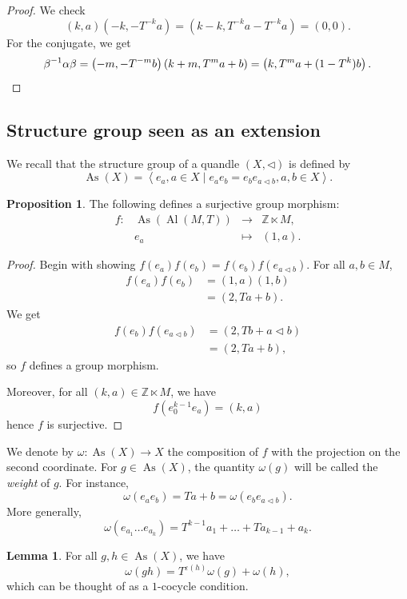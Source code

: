 \documentclass[a4paper,11pt]{amsart}
\theoremstyle{definition}
\newtheorem{lem}[thm]{Lemma}
\newtheorem{prop}[thm]{Proposition}
\newcommand{\Z}{{\mathbb Z}}
\DeclareMathOperator{\Al}{Al}
\DeclareMathOperator{\As}{As}
\begin{document}
\begin{proof}
We check
$$(k,a)(-k,-T^{-k}a) = (k - k, T^{-k}a - T^{-k} a) = (0,0).$$
For the conjugate, we get
\[ \beta^{-1} \alpha \beta = \left ( -m, -T^{-m} b \right ) \left ( k+m, T^m a + b\right ) = \left (k, T^m a + (1-T^k) b \right ).\qedhere\]
\end{proof}

\subsection{Structure group seen as an extension}
We recall that the structure group of a quandle $(X,\lhd)$ is defined by
\[ \As(X) = \left<e_a, a\in X \mid e_a e_b = e_b e_{a\lhd b}, a,b\in X \right>. \]

\begin{prop}
The following defines a surjective group morphism:
\[ \begin{array}{cccc}
f: & \As(\Al(M,T)) & \longrightarrow & \Z \ltimes M,\\
& e_a & \longmapsto & (1,a).
\end{array} \]
\end{prop}
\begin{proof}
Begin with showing $f(e_a) f(e_b) = f(e_b) f(e_{a\lhd b})$.
For all $a,b\in M$,
\begin{align*}
f(e_a) f(e_b) & = (1,a) (1,b)\\
& = (2, Ta +b).
\end{align*}
We get
\begin{align*}
f(e_b) f(e_{a\lhd b}) & = (2, Tb + a\lhd b)\\
& = (2, Ta + b),
\end{align*}
so $f$ defines a group morphism.

Moreover, for all $(k,a)\in \Z\ltimes M$, we have
\[ f(e_0^{k-1} e_a) = (k,a) \]
hence $f$ is surjective.
\end{proof}
We denote by $\omega: \As(X) \to X$ the composition of $f$ with the projection on the second coordinate.
For $g\in \As(X)$, the quantity $\omega(g)$ will be called the \emph{weight} of $g$.
For instance,
\[
\omega(e_a e_b) = Ta + b = \omega(e_b e_{a\lhd b}).
\]
More generally,
\[
\omega(e_{a_1} \ldots e_{a_k}) = T^{k-1} a_1 + \ldots + T a_{k-1} + a_k.
\]
\begin{lem}
For all $g,h\in \As(X)$, we have
\begin{equation}\label{eq:omega_1cocycle}
\omega(gh) = T^{\varepsilon(h)} \omega(g) + \omega(h),
\end{equation}
which can be thought of as a $1$-cocycle condition.
\end{lem}
\end{document}
